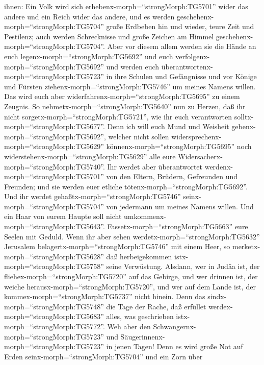 ihnen: Ein Volk wird sich erhebenx-morph=``strongMorph:TG5701'' wider
das andere und ein Reich wider das andere,  und es werden
geschehenx-morph=``strongMorph:TG5704'' große Erdbeben hin und wieder,
teure Zeit und Pestilenz; auch werden Schrecknisse und große Zeichen am
Himmel geschehenx-morph=``strongMorph:TG5704''.  Aber vor
diesem allem werden sie die Hände an euch
legenx-morph=``strongMorph:TG5692'' und euch
verfolgenx-morph=``strongMorph:TG5692'' und werden euch
überantwortenx-morph=``strongMorph:TG5723'' in ihre Schulen und
Gefängnisse und vor Könige und Fürsten
ziehenx-morph=``strongMorph:TG5746'' um meines Namens willen.
 Das wird euch aber
widerfahrenx-morph=``strongMorph:TG5695'' zu einem Zeugnis.
 So nehmetx-morph=``strongMorph:TG5640'' nun zu Herzen, daß
ihr nicht sorgetx-morph=``strongMorph:TG5721'', wie ihr euch
verantworten solltx-morph=``strongMorph:TG5677''.  Denn ich
will euch Mund und Weisheit gebenx-morph=``strongMorph:TG5692'', welcher
nicht sollen widersprechenx-morph=``strongMorph:TG5629''
könnenx-morph=``strongMorph:TG5695'' noch
widerstehenx-morph=``strongMorph:TG5629'' alle eure
Widersacherx-morph=``strongMorph:TG5740''.  Ihr werdet aber
überantwortet werdenx-morph=``strongMorph:TG5701'' von den Eltern,
Brüdern, Gefreunden und Freunden; und sie werden euer etliche
tötenx-morph=``strongMorph:TG5692''.  Und ihr werdet
gehaßtx-morph=``strongMorph:TG5746'' seinx-morph=``strongMorph:TG5704''
von jedermann um meines Namens willen.  Und ein Haar von
eurem Haupte soll nicht umkommenx-morph=``strongMorph:TG5643''.
 Fassetx-morph=``strongMorph:TG5663'' eure Seelen mit
Geduld.  Wenn ihr aber sehen
werdetx-morph=``strongMorph:TG5632'' Jerusalem
belagertx-morph=``strongMorph:TG5746'' mit einem Heer, so
merketx-morph=``strongMorph:TG5628'' daß herbeigekommen
istx-morph=``strongMorph:TG5758'' seine Verwüstung. 
Alsdann, wer in Judäa ist, der fliehex-morph=``strongMorph:TG5720'' auf
das Gebirge, und wer drinnen ist, der weiche
herausx-morph=``strongMorph:TG5720'', und wer auf dem Lande ist, der
kommex-morph=``strongMorph:TG5737'' nicht hinein.  Denn das
sindx-morph=``strongMorph:TG5748'' die Tage der Rache, daß erfüllet
werdex-morph=``strongMorph:TG5683'' alles, was geschrieben
istx-morph=``strongMorph:TG5772''.  Weh aber den
Schwangernx-morph=``strongMorph:TG5723'' und
Säugerinnenx-morph=``strongMorph:TG5723'' in jenen Tagen! Denn es wird
große Not auf Erden seinx-morph=``strongMorph:TG5704'' und ein Zorn über
